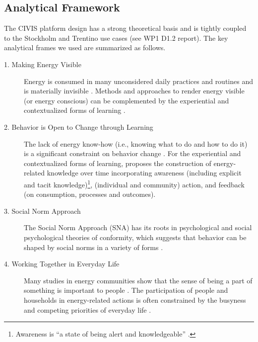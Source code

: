 
\subsection{Analytical Framework}

The CIVIS platform design has a strong theoretical basis and is tightly coupled to the Stockholm and Trentino use cases (see WP1 D1.2 report). 
The key analytical frames we used are summarized as follows. 

\begin{description}
\item[1. Making Energy Visible] Energy is consumed in many unconsidered daily practices and routines and is materially invisible \citep{Burgess2008,Hargreaves2010,Fehrenbacher2011,Burchell2014}. Methods and approaches to render energy visible (or energy conscious) can be complemented by the experiential and contextualized forms of learning \citep{Burchell2014}. 

\item[2. Behavior is Open to Change through Learning] The lack of energy know-how (i.e., knowing what to do and how to do it) is a significant constraint on behavior change \citep{Burchell2014}. For the experiential and contextualized forms of learning, \citet{Darby2006} proposes the construction of energy-related knowledge over time incorporating awareness (including explicit and tacit knowledge)\footnote{Awareness is ``a state of being alert and knowledgeable'' \citep{Darby2006}.}, (individual and community) action, and feedback (on consumption, processes and outcomes). 

\item[3. Social Norm Approach] The Social Norm Approach (SNA) has its roots in psychological and social psychological theories of conformity, which suggests that behavior can be shaped by social norms in a variety of forms \citep{Ayres2013,Abrahamse2013,Burchell2014,Dietz2015}. 

\item[4. Working Together in Everyday Life] Many studies in energy communities show that the sense of being a part of something is important to people \citep{Darby2006,Burchell2014}. The participation of people and households in energy-related actions is often constrained by the busyness and competing priorities of everyday life \citep{Burchell2014,Dillahunt2014,Strengers2014}. 
\end{description}

 



